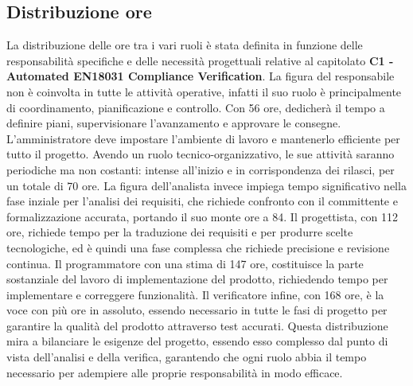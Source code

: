 \documentclass[a4paper,12pt]{article}
\begin{document}
{    \subsection{Distribuzione ore}{
        La distribuzione delle ore tra i vari ruoli è stata definita in funzione delle responsabilità specifiche e delle necessità progettuali relative al capitolato \textbf{C1 - Automated EN18031 Compliance Verification}.
        \vspace{0.3cm}
        \newline
        La figura del responsabile non è coinvolta in tutte le attività operative, infatti il suo ruolo è principalmente di coordinamento, pianificazione e controllo. Con 56 ore, dedicherà il tempo a definire piani, supervisionare l'avanzamento e approvare le consegne.
        \vspace{0.3cm}
        \newline
        L'amministratore deve impostare l'ambiente di lavoro e mantenerlo efficiente per tutto il progetto. Avendo un ruolo tecnico-organizzativo, le sue attività saranno periodiche ma non costanti: intense all'inizio e in corrispondenza dei rilasci, per un totale di 70 ore.
        \vspace{0.3cm}
        \newline
        La figura dell'analista invece impiega tempo significativo nella fase inziale per l'analisi dei requisiti, che richiede confronto con il committente e formalizzazione accurata, portando il suo monte ore a 84.
        \vspace{0.3cm}
        \newline
        Il progettista, con 112 ore, richiede tempo per la traduzione dei requisiti e per produrre scelte tecnologiche, ed è quindi una fase complessa che richiede precisione e revisione continua.
        \vspace{0.3cm}
        \newline
        Il programmatore con una stima di 147 ore, costituisce la parte sostanziale del lavoro di implementazione del prodotto, richiedendo tempo per implementare e correggere funzionalità.
        \vspace{0.3cm}
        \newline
        Il verificatore infine, con 168 ore, è la voce con più ore in assoluto, essendo necessario in tutte le fasi di progetto per garantire la qualità del prodotto attraverso test accurati.
        \vspace{0.3cm}
        \newline
        Questa distribuzione mira a bilanciare le esigenze del progetto, essendo esso complesso dal punto di vista dell'analisi e della verifica, garantendo che ogni ruolo abbia il tempo necessario per adempiere alle proprie responsabilità in modo efficace.
    }
}
\end{document}
